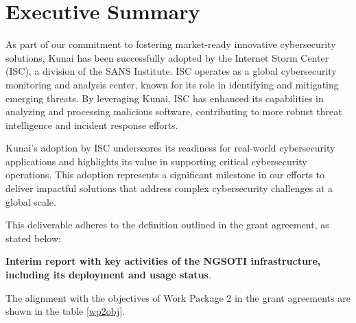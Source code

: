 \section*{Executive Summary}

As part of our commitment to fostering market-ready innovative cybersecurity solutions, Kunai has been successfully adopted by the Internet Storm Center (ISC)\cite{kunai_isc_sans}, a division of the SANS Institute. ISC operates as a global cybersecurity monitoring and analysis center, known for its role in identifying and mitigating emerging threats. By leveraging Kunai, ISC has enhanced its capabilities in analyzing and processing malicious software, contributing to more robust threat intelligence and incident response efforts.

Kunai's adoption by ISC underscores its readiness for real-world cybersecurity applications and highlights its value in supporting critical cybersecurity operations. This adoption represents a significant milestone in our efforts to deliver impactful solutions that address complex cybersecurity challenges at a global scale.


This deliverable adheres to the definition outlined in the grant agreement, as stated below:

\textbf{ Interim report with key activities of the NGSOTI infrastructure, including its deployment and usage status}.

The alignment with the objectives of Work Package 2 in the grant agreements are shown in the table \ref{wp2obj}.


